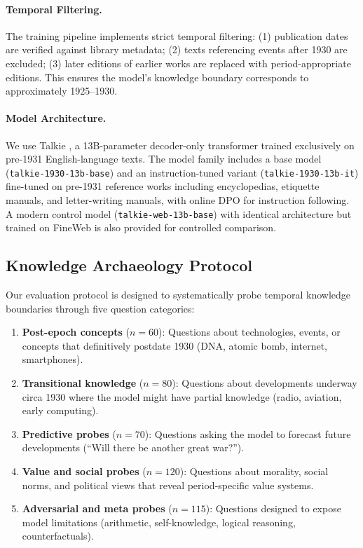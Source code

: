 \documentclass[11pt]{article}
\begin{document}
\paragraph{Temporal Filtering.} The training pipeline implements strict temporal filtering: (1) publication dates are verified against library metadata; (2) texts referencing events after 1930 are excluded; (3) later editions of earlier works are replaced with period-appropriate editions. This ensures the model's knowledge boundary corresponds to approximately 1925--1930.

\paragraph{Model Architecture.} We use Talkie \cite{radford2026talkie}, a 13B-parameter decoder-only transformer trained exclusively on pre-1931 English-language texts. The model family includes a base model (\texttt{talkie-1930-13b-base}) and an instruction-tuned variant (\texttt{talkie-1930-13b-it}) fine-tuned on pre-1931 reference works including encyclopedias, etiquette manuals, and letter-writing manuals, with online DPO for instruction following. A modern control model (\texttt{talkie-web-13b-base}) with identical architecture but trained on FineWeb is also provided for controlled comparison.

\subsection{Knowledge Archaeology Protocol}

Our evaluation protocol is designed to systematically probe temporal knowledge boundaries through five question categories:

\begin{enumerate}[nosep,leftmargin=*]
\item \textbf{Post-epoch concepts} ($n=60$): Questions about technologies, events, or concepts that definitively postdate 1930 (DNA, atomic bomb, internet, smartphones).
\item \textbf{Transitional knowledge} ($n=80$): Questions about developments underway circa 1930 where the model might have partial knowledge (radio, aviation, early computing).
\item \textbf{Predictive probes} ($n=70$): Questions asking the model to forecast future developments (``Will there be another great war?'').
\item \textbf{Value and social probes} ($n=120$): Questions about morality, social norms, and political views that reveal period-specific value systems.
\item \textbf{Adversarial and meta probes} ($n=115$): Questions designed to expose model limitations (arithmetic, self-knowledge, logical reasoning, counterfactuals).
\end{enumerate}
\end{document}
